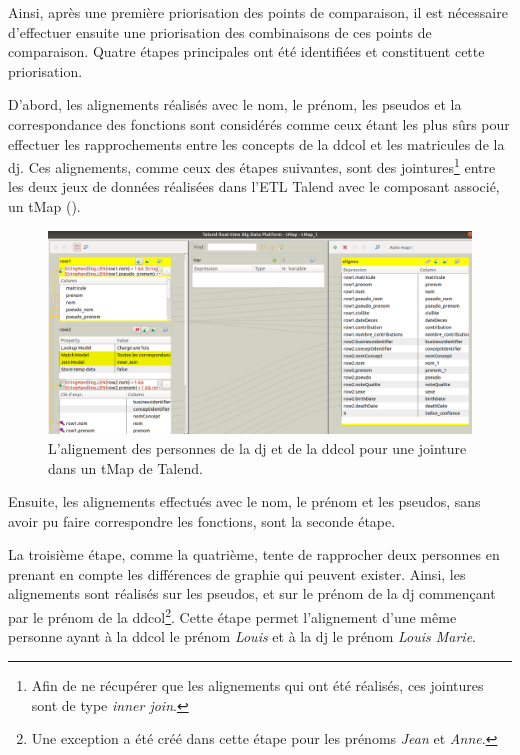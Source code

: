 Ainsi, après une première priorisation des points de comparaison, il est nécessaire d'effectuer ensuite une priorisation des combinaisons de ces points de comparaison. Quatre étapes principales ont été identifiées et constituent cette priorisation.

\noindent D'abord, les alignements réalisés avec le nom, le prénom, les pseudos et la correspondance des fonctions sont considérés comme ceux étant les plus sûrs pour effectuer les rapprochements entre les concepts de la \ac{ddcol} et les matricules de la \ac{dj}. Ces alignements, comme ceux des étapes suivantes, sont des jointures\footnote{Afin de ne récupérer que les alignements qui ont été réalisés, ces jointures sont de type \textit{inner join}.} entre les deux jeux de données réalisées dans l'ETL Talend avec le composant associé, un tMap ().
\begin{figure}[!h]
	\centering
	\includegraphics[width=14cm]{images/tmpa_jointure1_dj.png}
	\caption{L'alignement des personnes de la \ac{dj} et de la \ac{ddcol} pour une jointure dans un tMap de Talend.}
	\label{tmap_jointures}
\end{figure}

\noindent Ensuite, les alignements effectués avec le nom, le prénom et les pseudos, sans avoir pu faire correspondre les fonctions, sont la seconde étape.

\noindent La troisième étape, comme la quatrième, tente de rapprocher deux personnes en prenant en compte les différences de graphie qui peuvent exister. Ainsi, les alignements sont réalisés sur les pseudos, et sur le prénom de la \ac{dj} commençant par le prénom de la \ac{ddcol}\footnote{Une exception a été créé dans cette étape pour les prénoms \textit{Jean} et \textit{Anne}.}. Cette étape permet l'alignement d'une même personne ayant à la \ac{ddcol} le prénom \textit{Louis} et à la \ac{dj} le prénom \textit{Louis Marie}.


